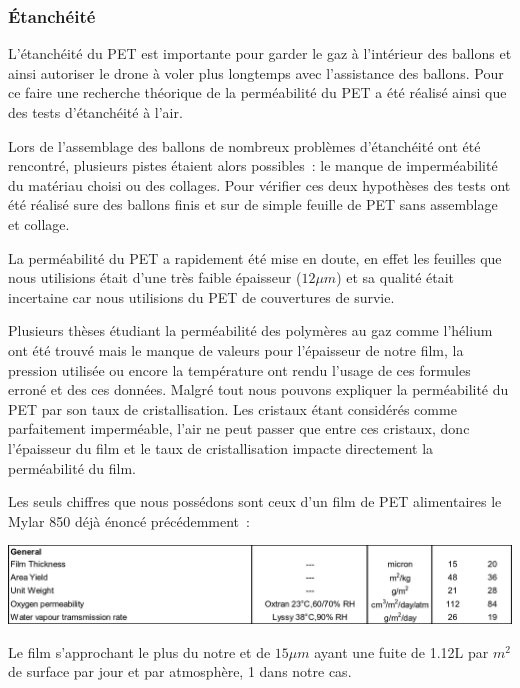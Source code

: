 \documentclass[a4paper,11pt]{article}
\begin{document}
\subsubsection{Étanchéité}

L'étanchéité du PET est importante pour garder le gaz à l'intérieur des ballons et ainsi autoriser le drone à voler plus longtemps avec l'assistance des ballons. Pour ce faire une recherche théorique de la perméabilité du PET a été réalisé ainsi que des tests d'étanchéité à l'air.

Lors de l'assemblage des ballons de nombreux problèmes d'étanchéité ont été rencontré, plusieurs pistes étaient alors possibles~: le manque de imperméabilité du matériau choisi ou des collages. Pour vérifier ces deux hypothèses des tests ont été réalisé sure des ballons finis et sur de simple feuille de PET sans assemblage et collage.


La perméabilité du PET a rapidement été mise en doute, en effet les feuilles que nous utilisions était d'une très faible épaisseur ($12\mu m$) et sa qualité était incertaine car nous utilisions du PET de couvertures de survie.

Plusieurs thèses étudiant la perméabilité des polymères au gaz comme l'hélium ont été trouvé mais le manque de valeurs pour l'épaisseur de notre film, la pression utilisée ou encore la température ont rendu l'usage de ces formules erroné et des ces données.
Malgré tout nous pouvons expliquer la perméabilité du PET par son taux de cristallisation. Les cristaux étant considérés comme parfaitement imperméable, l'air ne peut passer que entre ces cristaux, donc l'épaisseur du film et le taux de cristallisation impacte directement la perméabilité du film.

Les seuls chiffres que nous possédons sont ceux d'un film de PET alimentaires le Mylar 850 déjà énoncé précédemment~:

\begin{center}
 \includegraphics[width=15cm]{../Images/permeabilite.png}
\end{center}

Le film s'approchant le plus du notre et de $15\mu m$ ayant une fuite de 1.12L par $m^2$ de surface par jour et par atmosphère, 1 dans notre cas.
\end{document}
